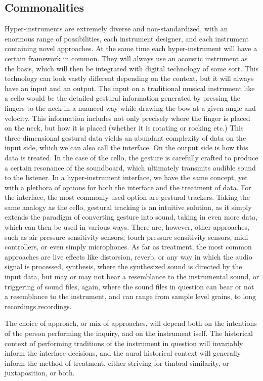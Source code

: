\documentclass[12pt,twoside,maitrise]{dms_ks}
\theoremstyle{definition}
\begin{document}
\subsection{Commonalities}

Hyper-instruments are extremely diverse and non-standardized, with an enormous range of possibilities, each instrument designer, and each instrument containing novel approaches. 
At the same time each hyper-instrument will have a certain framework in common. 
They will always use an acoustic instrument as the basis, which will then be integrated with digital technology of some sort. 
This technology can look vastly different depending on the context, but it will always have an input and an output. 
The input on a traditional musical instrument like a cello would be the detailed gestural information generated by pressing the fingers to the neck in a nuanced way while drawing the bow at a given angle and velocity. 
This information includes not only precisely where the finger is placed on the neck, but how it is placed (whether it is rotating or rocking etc.) This three-dimensional gestural data yields an abundant complexity of data on the input side, which we can also call the interface. 
On the output side is how this data is treated. 
In the case of the cello, the gesture is carefully crafted to produce a certain resonance of the soundboard, which ultimately transmits audible sound to the listener. 
In a hyper-instrument interface, we have the same concept, yet with a plethora of options for both the interface and the treatment of data. 
For the interface, the most commonly used option are gestural trackers. 
Taking the same analogy as the cello, gestural tracking is an intuitive solution, as it simply extends the paradigm of converting gesture into sound, taking in even more data, which can then be used in various ways. 
There are, however, other approaches, such as air pressure sensitivity sensors, touch pressure sensitivity sensors, midi controllers, or even simply microphones. 
As far as treatment, the most common approaches are live effects like distorsion, reverb, or any way in which the audio signal is processed, synthesis, where the synthesized sound is directed by the input data, but may or may not bear a resemblance to the instrumental sound, or triggering of sound files, again, where the sound files in question can bear or not a resemblance to the instrument, and can range from sample level grains, to long recordings.recordings.

The choice of approach, or mix of approaches, will depend both on the intentions of the person performing the inquiry, and on the instrument iself. The historical context of performing traditions of the instrument in question will invariably inform the interface decisions, and the aural historical context will generally inform the method of treatment, either striving for timbral similarity, or juxtaposition, or both.
\end{document}
